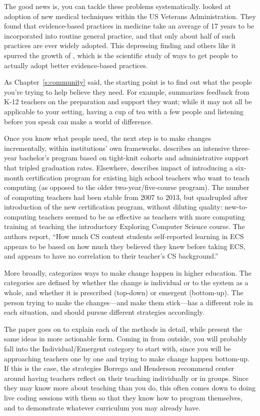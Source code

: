 The good news is, you can tackle these problems systematically.
\cite{Baue2015} looked at adoption of new medical
techniques within the US Veterans Administration. They found that
evidence-based practices in medicine take an average of 17 years to be
incorporated into routine general practice, and that only about half
of such practices are ever widely adopted. This depressing finding and
others like it spurred the growth of , which is the
scientific study of ways to get people to actually adopt better
evidence-based practices.

As Chapter~\ref{s:community} said, the starting point is to find out what
the people you're trying to help believe they need. For example,
\cite{Yada2016} summarizes feedback from K-12 teachers on the
preparation and support they want; while it may not all be applicable to
your setting, having a cup of tea with a few people and listening before
you speak can make a world of difference.

Once you know what people need, the next step is to make changes
incrementally, within institutions' own frameworks. \cite{Nara2018}
describes an intensive three-year bachelor's program based on tight-knit
cohorts and administrative support that tripled graduation rates.
Elsewhere, \cite{Hu2017} describes impact of introducing a six-month
certification program for existing high school teachers who want to
teach computing (as opposed to the older two-year/five-course program).
The number of computing teachers had been stable from 2007 to 2013, but
quadrupled after introduction of the new certification program, without
diluting quality: new-to-computing teachers seemed to be as effective as
teachers with more computing training at teaching the introductory
Exploring Computer Science course. The authors report, ``How much CS
content students self-reported learning in ECS appears to be based on
how much they believed they knew before taking ECS, and appears to have
no correlation to their teacher's CS background.''

More broadly, \cite{Borr2014} categorizes ways to make change happen
in higher education. The categories are defined by whether the change is
individual or to the system as a whole, and whether it is prescribed
(top-down) or emergent (bottom-up). The person trying to make the
changes---and make them stick---has a different role in each situation, and
should pursue different strategies accordingly.

The paper goes on to explain each of the methods in detail, while
\cite{Hend2015a,Hend2015b} present the same ideas in more actionable
form. Coming in from outside, you will probably fall into the
Individual/Emergent category to start with, since you will be
approaching teachers one by one and trying to make change happen
bottom-up. If this is the case, the strategies Borrego and Henderson
recommend center around having teachers reflect on their teaching
individually or in groups. Since they may know more about teaching than
you do, this often comes down to doing live coding sessions with them so
that they know how to program themselves, and to demonstrate whatever
curriculum you may already have.

